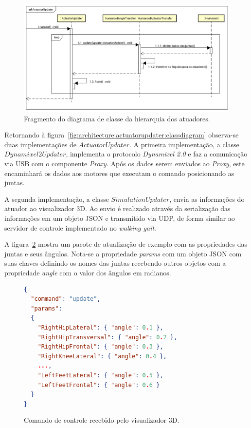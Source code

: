 \begin{figure}[htb]
	\centering
	\includegraphics[scale=0.45]{imagens/svg/softwarearchitecture-actuatorudpater-sequence}
	\caption{Fragmento do diagrama de classe da hierarquia dos atuadores.}
	\label{fig:architecture:actuatorupdater:sequence}
\end{figure}

Retornando à figura~\ref{fig:architecture:actuatorupdater:classdiagram} observa-se duas implementações de $ActuatorUpdater$. A primeira implementação, a classe $Dynamixel2Updater$, implementa o protocolo \textit{Dynamixel 2.0} e faz a comunicação via USB com o componente \textit{Proxy}. Após os dados serem enviados ao \textit{Proxy}, este encaminhará os dados aos motores que executam o comando posicionando as juntas.

A segunda implementação, a classe $SimulationUpdater$, envia as informações do atuador ao visualizador 3D. Ao envio é realizado através da serialização das informações em um objeto JSON e transmitido via UDP, de forma similar ao servidor de controle implementado no \textit{walking gait}.

A figura~\ref{fig:architecture:walkinggait:visualization:json} mostra um pacote de atualização de exemplo com as propriedades das juntas e seus ângulos. Nota-se a propriedade \textit{params} com um objeto JSON com suas chaves definindo os nomes das juntas recebendo outros objetos com a propriedade \textit{angle} com o valor dos ângulos em radianos.

\begin{figure}[htb]
	\begin{lstlisting}[language=json,firstnumber=1]
{
  "command": "update",
  "params":
  {
    "RightHipLateral": { "angle": 0.1 },
    "RightHipTransversal": { "angle": 0.2 },
    "RightHipFrontal": { "angle": 0.3 },
    "RightKneeLateral": { "angle": 0.4 },
	...,
    "LeftFeetLateral": { "angle": 0.5 },
    "LeftFeetFrontal": { "angle": 0.6 }
  }
}
\end{lstlisting}
	\caption{Comando de controle recebido pelo visualizador 3D.}
	\label{fig:architecture:walkinggait:visualization:json}
\end{figure}

